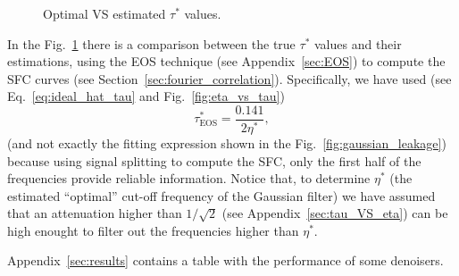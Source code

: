 \documentclass{article}
\begin{document}
\begin{figure}
  \centering
  \caption{Optimal VS estimated $\tau^*$ values.\label{fig:tau_GF_estimation}}
\end{figure}

In the Fig.~\ref{fig:tau_GF_estimation} there is a comparison between
the true $\tau^*$ values and their estimations, using the EOS
technique (see Appendix~\ref{sec:EOS}) to compute the SFC curves (see
Section~\ref{sec:fourier_correlation}). Specifically, we have used
(see Eq.~\ref{eq:ideal_hat_tau} and Fig.~\ref{fig:eta_vs_tau})
\begin{equation}
  \tau^*_{\text{EOS}} = \frac{0.141}{2\eta^*},
  \label{eq:tau_VS_eta_empirical_EOS}
\end{equation}
(and not exactly the fitting expression shown in the
Fig.~\ref{fig:gaussian_leakage}) because using signal splitting to
compute the SFC, only the first half of the frequencies provide
reliable information. Notice that, to determine $\eta^*$ (the
estimated ``optimal'' cut-off frequency of the Gaussian filter) we
have assumed that an attenuation higher than $1/\sqrt{2}$ (see
Appendix~\ref{sec:tau_VS_eta}) can be high enought to filter out the
frequencies higher than $\eta^*$.

Appendix~\ref{sec:results} contains a table with the performance of
some denoisers.


\end{document}
